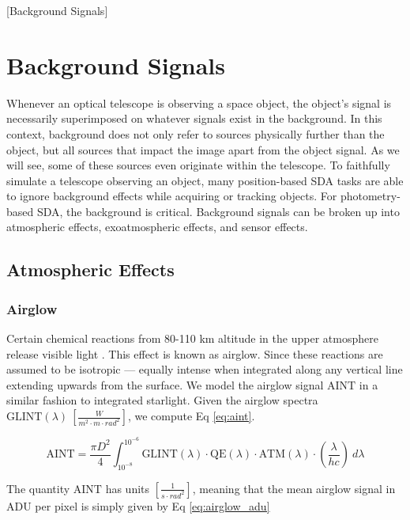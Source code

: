 [Background Signals]
\chapter{Background Signals}
\graphicspath{{/Users/liamrobinson/Documents/PyLightCurves/docs/build/html/_images}}

Whenever an optical telescope is observing a space object, the object's signal is necessarily superimposed on whatever signals exist in the background. In this context, background does not only refer to sources physically further than the object, but all sources that impact the image apart from the object signal. As we will see, some of these sources even originate within the telescope. To faithfully simulate a telescope observing an object, many position-based SDA tasks are able to ignore background effects while acquiring or tracking objects. For photometry-based SDA, the background is critical. Background signals can be broken up into atmospheric effects, exoatmospheric effects, and sensor effects. 

\section{Atmospheric Effects}

\subsection{Airglow}

Certain chemical reactions from 80-110 km altitude in the upper atmosphere release visible light
\cite{krag2003}. This effect is known as
airglow. Since these reactions are assumed to be isotropic ---  equally intense when integrated along any
vertical line extending upwards from the surface. We model the airglow signal $\textrm{AINT}$ in a
similar fashion to integrated starlight. Given the airglow spectra $\textrm{GLINT}(\lambda) \:
\left[ \frac{W}{m^2\cdot m \cdot rad^2} \right]$, we compute Eq \ref{eq:aint}.

\begin{equation} \label{eq:aint}
 \textrm{AINT} = \frac{\pi D^2}{4}
  \int_{10^{-8}}^{10^{-6}}{ \textrm{GLINT}(\lambda) \cdot \textrm{QE}(\lambda) \cdot \textrm{ATM}(\lambda)
  \cdot \left( \frac{\lambda}{h c} \right) \: d\lambda}  
\end{equation}

The quantity $\textrm{AINT}$ has units $\left[ \frac{1}{s\cdot rad^2} \right]$, meaning that the
mean airglow signal in ADU per pixel is simply given by Eq \ref{eq:airglow_adu}

